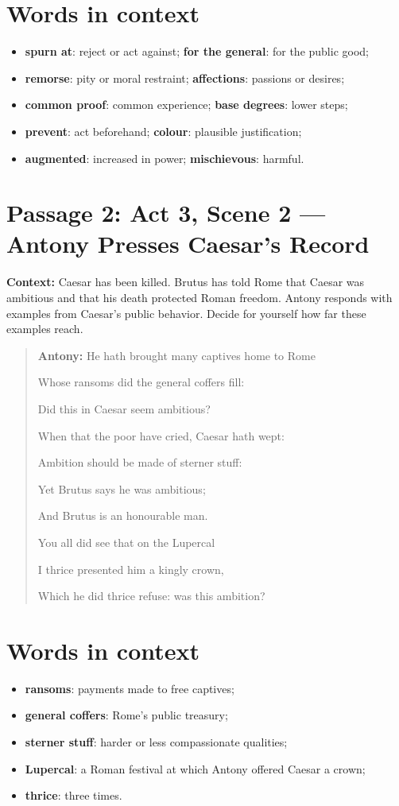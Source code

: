 \documentclass[11pt]{article}
\newenvironment{playpassage}{\begin{quote}\small\setlength{\parskip}{0.05em}\setlength{\parindent}{0pt}}{\end{quote}}
\newcommand{\speaker}[1]{\textbf{#1:}}
\begin{document}
\section*{Words in context}
\begin{itemize}
\item \textbf{spurn at}: reject or act against; \textbf{for the general}: for the public good;
\item \textbf{remorse}: pity or moral restraint; \textbf{affections}: passions or desires;
\item \textbf{common proof}: common experience; \textbf{base degrees}: lower steps;
\item \textbf{prevent}: act beforehand; \textbf{colour}: plausible justification;
\item \textbf{augmented}: increased in power; \textbf{mischievous}: harmful.
\end{itemize}

\newpage
\section*{Passage 2: Act 3, Scene 2 --- Antony Presses Caesar's Record}
\textbf{Context:} Caesar has been killed. Brutus has told Rome that Caesar was ambitious and that his death protected Roman freedom. Antony responds with examples from Caesar's public behavior. Decide for yourself how far these examples reach.
\begin{playpassage}
\speaker{Antony} He hath brought many captives home to Rome\par
Whose ransoms did the general coffers fill:\par
Did this in Caesar seem ambitious?\par
When that the poor have cried, Caesar hath wept:\par
Ambition should be made of sterner stuff:\par
Yet Brutus says he was ambitious;\par
And Brutus is an honourable man.\par
You all did see that on the Lupercal\par
I thrice presented him a kingly crown,\par
Which he did thrice refuse: was this ambition?
\end{playpassage}
\section*{Words in context}
\begin{itemize}
\item \textbf{ransoms}: payments made to free captives;
\item \textbf{general coffers}: Rome's public treasury;
\item \textbf{sterner stuff}: harder or less compassionate qualities;
\item \textbf{Lupercal}: a Roman festival at which Antony offered Caesar a crown;
\item \textbf{thrice}: three times.
\end{itemize}
\end{document}
